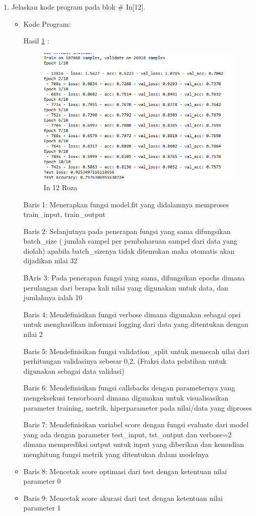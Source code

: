 \begin{enumerate}
\item Jelaskan kode program pada blok \# In[12].
\begin{itemize}
\item Kode Program:

\par Hasil \ref{in12roza} :
\begin{figure}[!hbtp]
\centering
\includegraphics[scale=0.7]{figures/prak12roza.png}
\caption{In 12 Roza}
\label{in12roza}
\end{figure}
\par Baris 1: Menerapkan fungsi model.fit yang didalamnya memproses train\_input, train\_output
\par Baris 2: Selanjutnya pada penerapan fungsi yang sama difungsikan batch\_size ( jumlah sampel per pembaharuan sampel dari data yang diolah) apabila batch\_sizenya tidak ditemukan maka otomatis akan dijadikan nilai 32	
\par BAris 3: Pada penerapan fungsi yang sama, difungsikan epochs dimana perulangan dari berapa kali nilai yang digunakan untuk data, dan jumlahnya ialah 10
\par Baris 4: Mendefinisikan fungsi verbose dimana digunakan sebagai opsi untuk menghasilkan informasi logging dari data yang ditentukan dengan nilai 2
\par Baris 5: Mendefinisikan fungsi validation\_split untuk memecah nilai dari perhitungan validasinya sebesar 0,2. (Fraksi data pelatihan untuk digunakan sebagai data validasi)
\par Baris 6: Mendefinisikan fungsi callsbacks dengan parameternya yang mengeksekusi tensorboard dimana digunakan untuk visualisasikan parameter training, metrik, hiperparameter pada nilai/data yang diproses
\par Baris 7: Mendefinisikan variabel score dengan fungsi evaluate dari model yang ada dengan parameter test\_input, tst\_output dan verbose=2 dimana memprediksi output untuk input yang diberikan dan kemudian menghitung fungsi metrik yang ditentukan dalam modelnya
\item Baris 8: Mencetak score optimasi dari test dengan ketentuan nilai parameter 0
\item Baris 9: Mencetak score akurasi dari test dengan ketentuan nilai parameter 1


\end{itemize}
\end{enumerate}
